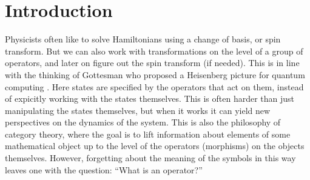 

\renewenvironment{framed}
{\begin{samepage}
\MakeFramed{\hsize0.8\linewidth\advance\hsize-\width\FrameRestore}}
{\endMakeFramed\end{samepage}}



\newcommand\dolemma[1]{\vskip 5pt \noindent{\bf \underline{Lemma #1}\ }}
\newcommand\doproposition[1]{\vskip 5pt \noindent {\bf \underline{Proposition #1}\ }}
\newcommand\dotheorem[1]{\vskip 5pt \noindent {\bf \underline{Theorem #1}\ }}
\newcommand\doproof{\vskip 5pt \noindent{\bf \underline{Proof:}\ }}

\newcommand\tombstone{\rule{.36em}{2ex}\vskip 5pt}






%
%

\section{Introduction}

Physicists often like to solve Hamiltonians 
using a change of basis, or spin transform.
But we can also work with transformations on the level of a
group of operators,
and later on figure out the spin transform (if needed).
This is in line with the thinking of 
Gottesman who proposed a Heisenberg picture for quantum computing \cite{Gottesman1998}.
Here states are specified by the operators that act on them, instead of
expicitly working with the states themselves.
This is often harder than just manipulating the
states themselves, but when it works it can yield
new perspectives on the dynamics of the system.
This is also
the philosophy of category theory, where the goal is to lift
information about elements of some mathematical object
up to the level of the operators (morphisms) on the
objects themselves.
However, forgetting about the meaning of the symbols in this way 
leaves one with the question:
``What is an operator?''

